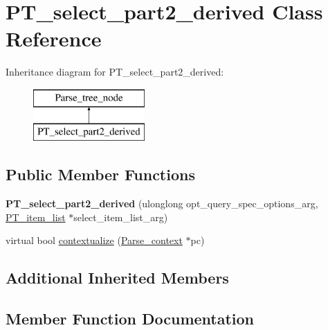 \hypertarget{classPT__select__part2__derived}{}\section{P\+T\+\_\+select\+\_\+part2\+\_\+derived Class Reference}
\label{classPT__select__part2__derived}
Inheritance diagram for P\+T\+\_\+select\+\_\+part2\+\_\+derived\+:\begin{figure}[H]
\begin{center}
\leavevmode
\includegraphics[height=2.000000cm]{classPT__select__part2__derived}
\end{center}
\end{figure}
\subsection*{Public Member Functions}
\begin{DoxyCompactItemize}
\item 
\mbox{\label{classPT__select__part2__derived_a08c87103c196cb67d86d14e794418ea9}} 
{\bfseries P\+T\+\_\+select\+\_\+part2\+\_\+derived} (ulonglong opt\+\_\+query\+\_\+spec\+\_\+options\+\_\+arg, \mbox{\hyperlink{classPT__item__list}{P\+T\+\_\+item\+\_\+list}} $\ast$select\+\_\+item\+\_\+list\+\_\+arg)
\item 
virtual bool \mbox{\hyperlink{classPT__select__part2__derived_a4d6a04cc75f7b50db701f2169fb8c130}{contextualize}} (\mbox{\hyperlink{structParse__context}{Parse\+\_\+context}} $\ast$pc)
\end{DoxyCompactItemize}
\subsection*{Additional Inherited Members}


\subsection{Member Function Documentation}
\mbox{\label{classPT__select__part2__derived_a4d6a04cc75f7b50db701f2169fb8c130}} 
